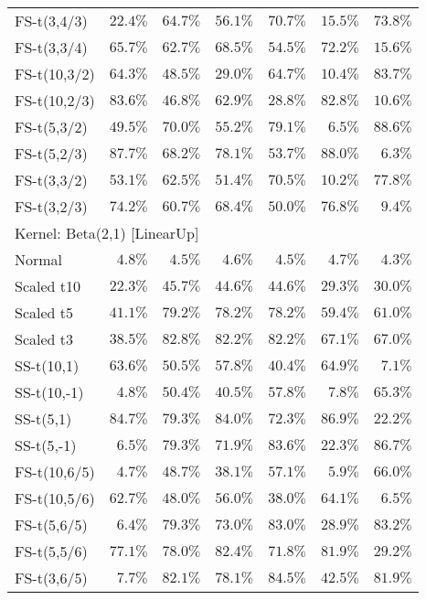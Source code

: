 \begin{longtable}{lrrrrrr}
FS-t(3,4/3) & $22.4\%$ & $64.7\%$ & $56.1\%$ & $70.7\%$ & $15.5\%$ & $73.8\%$ \\ 
FS-t(3,3/4) & $65.7\%$ & $62.7\%$ & $68.5\%$ & $54.5\%$ & $72.2\%$ & $15.6\%$ \\ 
FS-t(10,3/2) & $64.3\%$ & $48.5\%$ & $29.0\%$ & $64.7\%$ & $10.4\%$ & $83.7\%$ \\ 
FS-t(10,2/3) & $83.6\%$ & $46.8\%$ & $62.9\%$ & $28.8\%$ & $82.8\%$ & $10.6\%$ \\ 
FS-t(5,3/2) & $49.5\%$ & $70.0\%$ & $55.2\%$ & $79.1\%$ & $6.5\%$ & $88.6\%$ \\ 
FS-t(5,2/3) & $87.7\%$ & $68.2\%$ & $78.1\%$ & $53.7\%$ & $88.0\%$ & $6.3\%$ \\ 
FS-t(3,3/2) & $53.1\%$ & $62.5\%$ & $51.4\%$ & $70.5\%$ & $10.2\%$ & $77.8\%$ \\ 
FS-t(3,2/3) & $74.2\%$ & $60.7\%$ & $68.4\%$ & $50.0\%$ & $76.8\%$ & $9.4\%$ \\ 
\midrule
\multicolumn{7}{l}{Kernel: Beta(2,1) [LinearUp]} \\ 
\midrule
Normal & $4.8\%$ & $4.5\%$ & $4.6\%$ & $4.5\%$ & $4.7\%$ & $4.3\%$ \\ 
Scaled t10 & $22.3\%$ & $45.7\%$ & $44.6\%$ & $44.6\%$ & $29.3\%$ & $30.0\%$ \\ 
Scaled t5 & $41.1\%$ & $79.2\%$ & $78.2\%$ & $78.2\%$ & $59.4\%$ & $61.0\%$ \\ 
Scaled t3 & $38.5\%$ & $82.8\%$ & $82.2\%$ & $82.2\%$ & $67.1\%$ & $67.0\%$ \\ 
SS-t(10,1) & $63.6\%$ & $50.5\%$ & $57.8\%$ & $40.4\%$ & $64.9\%$ & $7.1\%$ \\ 
SS-t(10,-1) & $4.8\%$ & $50.4\%$ & $40.5\%$ & $57.8\%$ & $7.8\%$ & $65.3\%$ \\ 
SS-t(5,1) & $84.7\%$ & $79.3\%$ & $84.0\%$ & $72.3\%$ & $86.9\%$ & $22.2\%$ \\ 
SS-t(5,-1) & $6.5\%$ & $79.3\%$ & $71.9\%$ & $83.6\%$ & $22.3\%$ & $86.7\%$ \\ 
FS-t(10,6/5) & $4.7\%$ & $48.7\%$ & $38.1\%$ & $57.1\%$ & $5.9\%$ & $66.0\%$ \\ 
FS-t(10,5/6) & $62.7\%$ & $48.0\%$ & $56.0\%$ & $38.0\%$ & $64.1\%$ & $6.5\%$ \\ 
FS-t(5,6/5) & $6.4\%$ & $79.3\%$ & $73.0\%$ & $83.0\%$ & $28.9\%$ & $83.2\%$ \\ 
FS-t(5,5/6) & $77.1\%$ & $78.0\%$ & $82.4\%$ & $71.8\%$ & $81.9\%$ & $29.2\%$ \\ 
FS-t(3,6/5) & $7.7\%$ & $82.1\%$ & $78.1\%$ & $84.5\%$ & $42.5\%$ & $81.9\%$ \\ 

\end{longtable}
